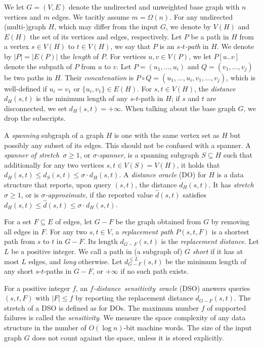 \documentclass{article}\usepackage[a4paper,margin=20mm]{geometry}
\renewcommand{\le}{\leqslant}
\renewcommand{\ge}{\geqslant}
\begin{document}
We let $G = (V,E)$ denote the undirected and unweighted base graph with $n$ vertices and $m$ edges.
We tacitly assume $m = \Omega(n)$.
For any undirected \mbox{(multi-)graph} $H$, which may differ from the input $G$,
we denote by $V(H)$ and $E(H)$ the set of its vertices and edges, respectively.
Let $P$ be a path in $H$ from a vertex $s \in V(H)$ to $t \in V(H)$,
we say that $P$ is an \emph{$s$-$t$-path} in $H$. 
We denote by $|P| = |E(P)|$ the \emph{length} of $P$.
For vertices $u,v \in V(P)$, we let $P[u..v]$ denote the subpath of $P$ from $u$ to $v$.
Let $P = (u_1, \dots, u_i)$ and $Q = (v_1, \dots, v_j)$ be two paths in $H$.
Their \emph{concatenation} is $P \circ Q = (u_1, \dots, u_i, v_1, \dots, v_j)$,
which is well-defined if $u_i = v_1$ or $\{u_i,v_1\} \in E(H)$.
For $s,t \in V(H)$, the \emph{distance} $d_H(s,t)$ 
is the minimum length of any $s$-$t$-path in $H$;
if $s$ and $t$ are disconnected, we set $d_H(s,t) =+ \infty$.
When talking about the base graph $G$, we drop the subscripts.

A \emph{spanning} subgraph of a graph $H$
is one with the same vertex set as $H$ but possibly any subset of its edges.
This should not be confused with a spanner.
A \emph{spanner of stretch}~$\sigma \ge 1$, or \emph{$\sigma$-spanner},
is a spanning subgraph $S \subseteq H$
such that additionally for any two vertices $s,t \in V(S) = V(H)$, 
it holds that $d_H(s,t) \le d_S(s,t) \le \sigma \cdot d_H(s,t)$.
A \emph{distance oracle} (DO) for $H$ is a data structure 
that reports, upon query $(s,t)$, the distance $d_H(s,t)$.
It has \emph{stretch} $\sigma \ge 1$, or is $\sigma$\emph{-approximate},
if the reported value $\widehat{d}(s,t)$
satisfies $d_H(s,t) \le \widehat{d}(s,t) \le \sigma \cdot d_H(s,t)$.

For a set $F \subseteq E$ of edges,
let $G{-}F$ be the graph obtained from $G$ by removing all edges in $F$.
For any two $s,t \in V$, a \emph{replacement path} $P(s,t,F)$ 
is a shortest path from $s$ to $t$ in $G{-}F$. 
Its length $d_{G-F}(s,t)$ is the \emph{replacement distance}.
Let $L$ be a positive integer.
We call a path in (a subgraph of) $G$ \emph{short} if it has at most $L$ edges,
and \emph{long} otherwise.
Let $d_{G-F}^{\le L}(s,t)$ be the minimum length
of any short $s$-$t$-paths in $G-F$, or $+\infty$ if no such path exists.

For a positive integer $f$, an \mbox{\emph{$f$-distance sensitivity oracle}} (DSO)
answers queries $(s,t,F)$ with $|F| \le f$ by reporting the replacement distance $d_{G-F}(s,t)$.
The stretch of a DSO is defined as for DOs.
The maximum number $f$ of supported failures is called the \emph{sensitivity}.
We measure the space complexity of any data structure in the number of $O(\log n)$-bit machine words.
The size of the input graph $G$ does not count against the space, 
unless it is stored explicitly.
\end{document}
